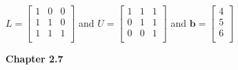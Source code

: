 \documentclass[10pt,twoside,reqno]{article}
\begin{document}
\begin{enumerate}
\begin{center}
$
$$
L=
\begin{bmatrix}
1&0&0\\
1&1&0\\
1&1&1\\
\end{bmatrix}
$$
$
and
$
$$
U =
\begin{bmatrix}
1&1&1\\
0&1&1\\
0&0&1\\
\end{bmatrix}
$$
$
and 
$
$$
\pmb{b} =
\begin{bmatrix}
4\\
5\\
6\\
\end{bmatrix}
$$
$
\end{center}
\end{enumerate}
\vspace{5mm}
\textbf{Chapter 2.7}
\end{document}
